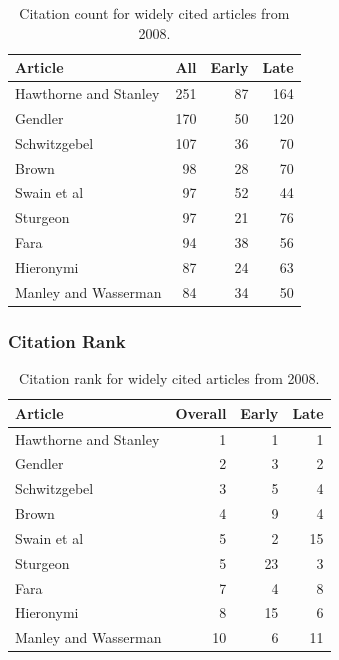 \documentclass[
  10pt,
  letterpaper,
  DIV=11,
  numbers=noendperiod,
  twoside]{scrartcl}
\begin{document}
\begin{longtable}[]{@{}lrrr@{}}

\caption{\label{tbl-citation-count-2008}Citation count for widely cited
articles from 2008.}

\tabularnewline

\toprule\noalign{}
Article & All & Early & Late \\
\midrule\noalign{}
\endhead
\bottomrule\noalign{}
\endlastfoot
Hawthorne and Stanley & 251 & 87 & 164 \\
Gendler & 170 & 50 & 120 \\
Schwitzgebel & 107 & 36 & 70 \\
Brown & 98 & 28 & 70 \\
Swain et al & 97 & 52 & 44 \\
Sturgeon & 97 & 21 & 76 \\
Fara & 94 & 38 & 56 \\
Hieronymi & 87 & 24 & 63 \\
Manley and Wasserman & 84 & 34 & 50 \\

\end{longtable}

\subsubsection*{Citation Rank}\label{sec-rank-2008}

\begin{longtable}[]{@{}lrrr@{}}

\caption{\label{tbl-citation-rank-2008}Citation rank for widely cited
articles from 2008.}

\tabularnewline

\toprule\noalign{}
Article & Overall & Early & Late \\
\midrule\noalign{}
\endhead
\bottomrule\noalign{}
\endlastfoot
Hawthorne and Stanley & 1 & 1 & 1 \\
Gendler & 2 & 3 & 2 \\
Schwitzgebel & 3 & 5 & 4 \\
Brown & 4 & 9 & 4 \\
Swain et al & 5 & 2 & 15 \\
Sturgeon & 5 & 23 & 3 \\
Fara & 7 & 4 & 8 \\
Hieronymi & 8 & 15 & 6 \\
Manley and Wasserman & 10 & 6 & 11 \\

\end{longtable}
\end{document}
